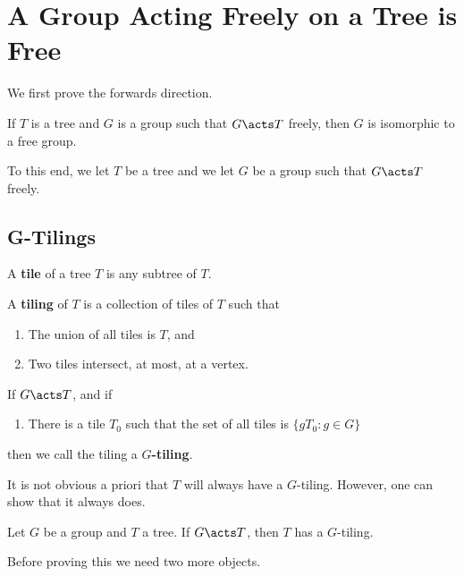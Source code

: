 \section{A Group Acting Freely on a Tree is Free}

We first prove the forwards direction.

\begin{thm}\label{Serre Forward Direction}
    If $T$ is a tree and $G$ is a group such that $G \acts T$ freely, then $G$ is isomorphic to a free group. 
\end{thm}

To this end, we let $T$ be a tree and we let $G$ be a group such that $G \acts T$ freely. 

\subsection{G-Tilings}

\begin{defn}
    A \textbf{tile} of a tree $T$ is any subtree of $T$. 

    A \textbf{tiling} of $T$ is a collection of tiles of $T$ such that 

    \begin{enumerate}
        \item The union of all tiles is $T$, and
        \item Two tiles intersect, at most, at a vertex.
    \end{enumerate}

    If $G \acts T$, and if 

    \begin{enumerate}
        \item[3.] There is a tile $T_0$ such that the set of all tiles is $\{gT_0: g \in G\}$
    \end{enumerate}

    then we call the tiling a \textbf{$G$-tiling}.
\end{defn}

It is not obvious a priori that $T$ will always have a $G$-tiling. However, one can show that it always does. 

\begin{thm}\label{Groups Acting on Trees have G-Tilings}
    Let $G$ be a group and $T$ a tree. If $G \acts T$, then $T$ has a $G$-tiling. 
\end{thm}

Before proving this we need two more objects.

